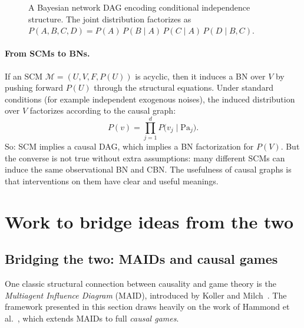 \documentclass{article}
\begin{document}

\begin{figure}[htbp]
\centering
{}
\caption{A Bayesian network DAG encoding conditional independence structure. The joint distribution factorizes as $P(A,B,C,D)=P(A)\,P(B\mid A)\,P(C\mid A)\,P(D\mid B,C)$.}
\label{fig:bn}
\end{figure}

\paragraph{From SCMs to BNs.}
If an SCM \(\mathcal{M}=(U,V,F,P(U))\) is acyclic, then it induces a BN over \(V\) by pushing forward \(P(U)\) through the structural equations. Under standard conditions (for example independent exogenous noises), the induced distribution over \(V\) factorizes according to the causal graph:
\[
P(v) =
\prod_{j=1}^d P\bigl(v_j \mid \mathrm{Pa}_j\bigr).
\]
So: SCM implies a causal DAG, which implies a BN factorization for \(P(V)\). But the converse is not true without extra assumptions: many different SCMs can induce the same observational BN and CBN. The usefulness of causal graphs is that interventions on them have clear and useful meanings.

\section{Work to bridge ideas from the two}
\subsection{Bridging the two: MAIDs and causal games}
One classic structural connection between causality and game theory is the \emph{Multiagent Influence Diagram} (MAID), introduced by Koller and Milch~\cite{koller2003maid}. The framework presented in this section draws heavily on the work of Hammond et al.~\cite{hammond2023causality}, which extends MAIDs to full \emph{causal games}.
\end{document}
